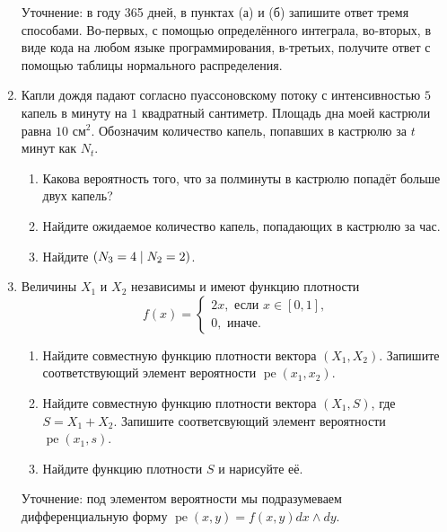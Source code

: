 \documentclass[12pt]{article}
\DeclareMathOperator{\pe}{pe}
\let\P\relax
\DeclareMathOperator{\P}{\mathbb{P}}
\begin{document}
\begin{enumerate}
Уточнение: в году 365 дней, в пунктах (а) и (б) запишите ответ тремя способами.
Во-первых, с помощью определённого интеграла, во-вторых, в виде кода на любом языке программирования, 
в-третьих, получите ответ с помощью таблицы нормального распределения. 

\item Капли дождя падают согласно пуассоновскому потоку с интенсивностью $5$ капель в минуту на $1$ квадратный сантиметр.
Площадь дна моей кастрюли равна $10$ см$^2$.
Обозначим количество капель, попавших в кастрюлю за $t$ минут как $N_t$.
\begin{enumerate}
    \item Какова вероятность того, что за полминуты в кастрюлю попадёт больше двух капель?
    \item Найдите ожидаемое количество капель, попадающих в кастрюлю за час.
    \item Найдите $\P(N_3 = 4 \mid N_2 = 2)$.
\end{enumerate}

\item Величины $X_1$ и $X_2$ независимы и имеют функцию плотности 
\[
f(x) = \begin{cases}
    2x, \text{ если } x\in [0, 1], \\
    0, \text{ иначе.}
\end{cases}
\]
\begin{enumerate}
    \item Найдите совместную функцию плотности вектора $(X_1, X_2)$.
    Запишите соответствующий элемент вероятности $\pe(x_1, x_2)$. 
    \item Найдите совместную функцию плотности вектора $(X_1, S)$, где $S = X_1 + X_2$.
    Запишите соответсвующий элемент вероятности $\pe(x_1, s)$.
    \item Найдите функцию плотности $S$ и нарисуйте её.
\end{enumerate}

Уточнение: под элементом вероятности мы подразумеваем дифференциальную форму $\pe(x, y) = f(x, y) dx \wedge dy$.

\end{enumerate}
\end{document}
